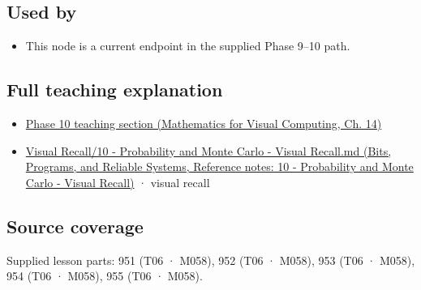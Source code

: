 \subsection{Used by}\label{appendix-33237f0f618b-used-by}

\hypertarget{appendix-33237f0f618b-used-by}{}

\begin{itemize}
\tightlist
\item
  This node is a current endpoint in the supplied Phase 9--10 path.
\end{itemize}

\subsection{Full teaching explanation}\label{appendix-33237f0f618b-full-teaching-explanation}

\hypertarget{appendix-33237f0f618b-full-teaching-explanation}{}

\begin{itemize}
\tightlist
\item
  \href{../02-Mathematics-for-Visual-Computing/main.pdf\#nameddest=02-foundations-ii-ch030-finite-samples-need-stable-descriptive-statistics}{Phase 10 teaching section (Mathematics for Visual Computing, Ch. 14)}
\item
  \href{../01-Bits-Programs-and-Reliable-Systems/main.pdf\#nameddest=appendix-cb5af353ef77}{Visual Recall/10 - Probability and Monte Carlo - Visual Recall.md (Bits, Programs, and Reliable Systems, Reference notes: 10 - Probability and Monte Carlo - Visual Recall)} · visual recall
\end{itemize}

\subsection{Source coverage}\label{appendix-33237f0f618b-source-coverage}

\hypertarget{appendix-33237f0f618b-source-coverage}{}

Supplied lesson parts: 951 (T06 · M058), 952 (T06 · M058), 953 (T06 · M058), 954 (T06 · M058), 955 (T06 · M058).
